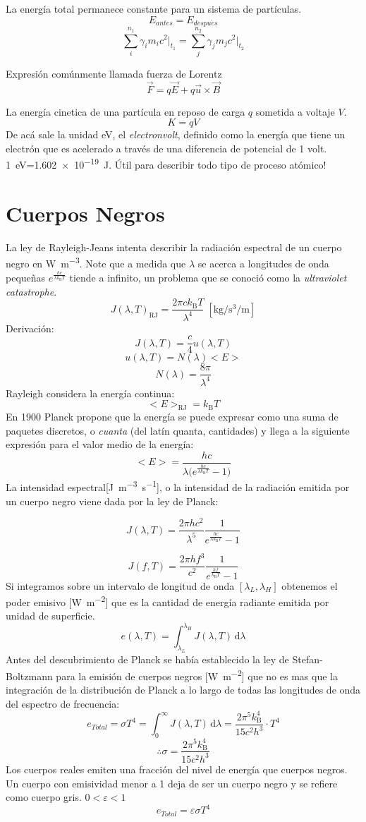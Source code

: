 \documentclass[10pt,twocolumn,titlepage]{article}
\newcommand{\formu}[2]{ #1 $$#2$$ \par \vspace{.4cm} }%
\newcommand{\formuc}[2]{ #1 $$#2$$ } %
\newcommand{\boltz}{k_\textrm{B}}
\newcommand{\di}{\,\textrm{d}}
\begin{document}
\formuc{La energía total permanece constante para un sistema de partículas.}{E_{antes}=E_{despu\acute{e}s}}
$$\sum_{i}^{n_1}\gamma_i m_ic^2\bigg|_{t_1}=\sum_{j}^{n_2}\gamma_j m_jc^2\bigg|_{t_2}$$
{\par \vspace{.5cm}}
\formu{Expresión comúnmente llamada fuerza de Lorentz}{\vec{F}=q\vec{E}+q\vec{u}\times\vec{B}}
\formuc{La energía cinetica de una partícula en reposo de carga $q$ sometida a voltaje $V$.}{K=qV}
De acá sale la unidad \si{\eV}, el \emph{electronvolt}, definido como la energía que tiene un electrón que es acelerado a través de una diferencia de potencial de 1 volt. \SI{1}{\electronvolt}=\SI{1.602e-19}{\joule}. Útil para describir todo tipo de proceso atómico!

\section{Cuerpos Negros}
La ley de Rayleigh-Jeans intenta describir la radiación espectral de un cuerpo negro en \si{\watt \per \meter \cubed}. Note que a medida que $\lambda$ se acerca a longitudes de onda pequeñas $e^{\frac{hc}{\lambda \boltz T}}$ tiende a infinito, un problema que se conoció como la \emph{ultraviolet catastrophe}.
$$J(\lambda,T)_{\textrm{RJ}}=\frac{2\pi c\boltz T}{\lambda^4} \; \left[ \si{\kg \per \second \cubed \per \meter}\right] $$
Derivación:
$$J(\lambda,T)=\frac{c}{4}u(\lambda,T)$$
$$u(\lambda,T)=N(\lambda)\big<E\big>$$
$$ N(\lambda)=\frac{8\pi}{\lambda^4} $$
Rayleigh considera la energía continua: 
$$\big<E\big>_{\textrm{RJ}}=\boltz T $$
En 1900 Planck propone que la energía se puede expresar como una suma de paquetes discretos, o \emph{cuanta} (del latín quanta, cantidades) y llega a la siguiente expresión para el valor medio de la energía:
$$ \big<E\big>=\frac{hc}{\lambda\big(e^{\frac{hc}{\lambda \boltz T}}-1\big)}$$
La intensidad espectral[\si{J.m^{-3}s^{-1}}], o la intensidad de la  radiación emitida por un cuerpo negro viene dada por la ley de Planck:

$$ J(\lambda,T)=\frac{2\pi hc^2}{\lambda^5}\frac{1}{e^{\frac{hc}{\lambda \boltz T}}-1 } $$

$$J(f,T)=\frac{2\pi hf^3}{c^2}\frac{1}{e^{\frac{hf}{ \boltz T}}-1 } $$
Si integramos sobre un intervalo de longitud de onda $[\lambda_L,\lambda_H]$ obtenemos el poder emisivo [\si{\watt \per \meter \squared}] que es la cantidad de energía radiante emitida por unidad de superficie.
$$e(\lambda,T)=\int_{\lambda_L}^{\lambda_H}J(\lambda,T)\di \lambda $$
Antes del descubrimiento de Planck se había establecido la ley de Stefan-Boltzmann para la emisión de cuerpos negros [\si{\watt \per \meter \squared}] que no es mas que la integración de la distribución de Planck a lo largo de todas las longitudes de onda del espectro de frecuencia:
$$e_{Total}=\sigma T^4 = \int_{0}^{\infty}J(\lambda,T)\di \lambda =\frac{2\pi^5\boltz ^4}{15c^2h^3}\cdot T^4$$
$$\therefore \sigma = \frac{2\pi^5\boltz ^4}{15c^2h^3} $$
Los cuerpos reales emiten una fracción del nivel de energía que cuerpos negros. Un cuerpo con emisividad menor a 1 deja de ser un cuerpo negro y se refiere como cuerpo gris. $0<\varepsilon<1$
$$e_{Total}=\varepsilon \sigma T^4 $$
\end{document}
